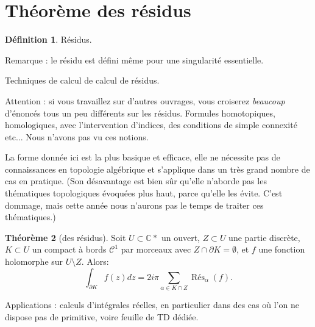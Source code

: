 \documentclass[11pt,a4paper]{book}
\newcommand{\C}{\mathbb{C}}
\theoremstyle{definition}
\newtheorem{theoreme}{Th\'eor\`eme}[section]
\newtheorem{definition}[theoreme]{D\'efinition}
\theoremstyle{plain}
\begin{document}


\section{Théorème des résidus}

\begin{definition}
Résidus.
\end{definition}

Remarque : le résidu est défini même pour une singularité essentielle.

Techniques de calcul de calcul de résidus.

Attention : si vous travaillez sur d'autres ouvrages, vous croiserez \emph{beaucoup} d'énoncés tous un peu différents sur les résidus. Formules homotopiques, homologiques, avec l'intervention d'indices, des conditions de simple connexité  etc... Nous n'avons pas vu ces notions. 

La forme donnée ici est la plus basique et efficace, elle ne nécessite pas de connaissances en topologie algébrique et s'applique dans un très grand nombre de cas en pratique. 
(Son désavantage est bien sûr qu'elle n'aborde pas les thématiques topologiques évoquées plus haut, parce qu'elle les évite. C'est dommage, mais cette année nous n'aurons pas le temps de traiter ces thématiques.)

\begin{theoreme}[des résidus]
Soit $U\subset \C*$ un ouvert, $Z\subset U$ une partie discrète, $K\subset U$ un compact à bords $\mathcal C^1$ par morceaux avec $Z\cap \partial K = \emptyset$, et $f$ une fonction holomorphe sur $U\setminus Z$.
Alors:
\[ \int_{\partial K} f(z)dz = 2i\pi \sum_{\alpha \in K\cap Z} \operatorname{Rés}_\alpha(f).\]
\end{theoreme}


Applications : calculs d'intégrales réelles, en particulier dans des cas où l'on ne dispose pas de primitive, voire feuille de TD dédiée.
\end{document}

